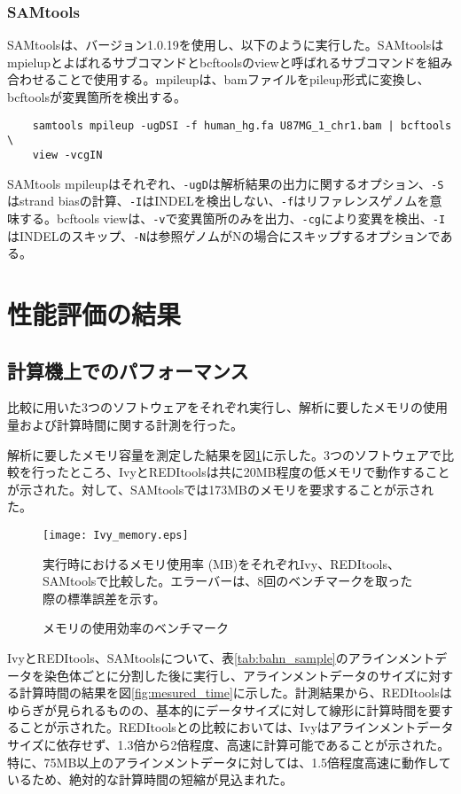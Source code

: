 \subsubsection{SAMtools}
SAMtoolsは、バージョン1.0.19を使用し、以下のように実行した。SAMtoolsはmpielupとよばれるサブコマンドとbcftoolsのviewと呼ばれるサブコマンドを組み合わせることで使用する。mpileupは、bamファイルをpileup形式に変換し、bcftoolsが変異箇所を検出する。
{\small
\begin{verbatim}
	samtools mpileup -ugDSI -f human_hg.fa U87MG_1_chr1.bam | bcftools \
	view -vcgIN
\end{verbatim}
}
SAMtools mpileupはそれぞれ、\texttt{-ugD}は解析結果の出力に関するオプション、\texttt{-S}はstrand biasの計算、\texttt{-I}はINDELを検出しない、\texttt{-f}はリファレンスゲノムを意味する。bcftools viewは、\texttt{-v}で変異箇所のみを出力、\texttt{-cg}により変異を検出、\texttt{-I}はINDELのスキップ、\texttt{-N}は参照ゲノムがNの場合にスキップするオプションである。

\section{性能評価の結果}
\subsection{計算機上でのパフォーマンス}
比較に用いた3つのソフトウェアをそれぞれ実行し、解析に要したメモリの使用量および計算時間に関する計測を行った。
\par
解析に要したメモリ容量を測定した結果を図\ref{fig:memory_usage}に示した。3つのソフトウェアで比較を行ったところ、IvyとREDItoolsは共に20MB程度の低メモリで動作することが示された。対して、SAMtoolsでは173MBのメモリを要求することが示された。

\begin{figure}[!ht]
	\begin{center}
		\texttt{[image: Ivy\_memory.eps]}
	\end{center}
	\caption{メモリの使用効率のベンチマーク}
	\begin{flushleft}
		\small{実行時におけるメモリ使用率 (MB)をそれぞれIvy、REDItools、SAMtoolsで比較した。エラーバーは、8回のベンチマークを取った際の標準誤差を示す。}
	\end{flushleft}
	\label{fig:memory_usage}
\end{figure}

\par
IvyとREDItools、SAMtoolsについて、表\ref{tab:bahn_sample}のアラインメントデータを染色体ごとに分割した後に実行し、アラインメントデータのサイズに対する計算時間の結果を図\ref{fig:mesured_time}に示した。計測結果から、REDItoolsはゆらぎが見られるものの、基本的にデータサイズに対して線形に計算時間を要することが示された。REDItoolsとの比較においては、Ivyはアラインメントデータサイズに依存せず、1.3倍から2倍程度、高速に計算可能であることが示された。特に、75MB以上のアラインメントデータに対しては、1.5倍程度高速に動作しているため、絶対的な計算時間の短縮が見込まれた。

